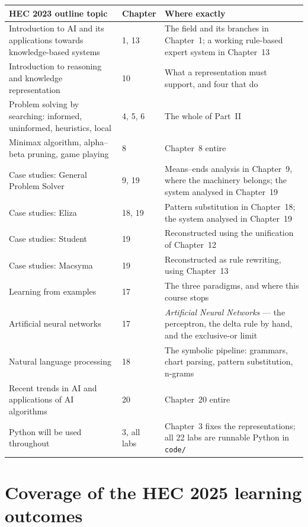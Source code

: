 \begin{longtable}{@{}L{6.4cm}L{2.0cm}L{6.6cm}@{}}
\toprule
{}
\textbf{HEC 2023 outline topic} & \textbf{Chapter} & \textbf{Where exactly} \\
\midrule
\endhead
Introduction to AI and its applications towards knowledge-based systems & 1, 13 &
The field and its branches in Chapter~1; a working rule-based expert system in
Chapter~13 \\
Introduction to reasoning and knowledge representation & 10 & What a
representation must support, and four that do \\
Problem solving by searching: informed, uninformed, heuristics, local & 4, 5, 6 &
The whole of Part~II \\
Minimax algorithm, alpha--beta pruning, game playing & 8 & Chapter~8 entire \\
Case studies: General Problem Solver & 9, 19 & Means--ends analysis in
Chapter~9, where the machinery belongs; the system analysed in Chapter~19 \\
Case studies: Eliza & 18, 19 & Pattern substitution in Chapter~18; the system
analysed in Chapter~19 \\
Case studies: Student & 19 & Reconstructed using the unification of Chapter~12 \\
Case studies: Macsyma & 19 & Reconstructed as rule rewriting, using Chapter~13 \\
Learning from examples & 17 & The three paradigms, and where this course
stops \\
Artificial neural networks & 17 & \emph{Artificial Neural Networks} --- the
perceptron, the delta rule by hand, and the exclusive-or limit \\
Natural language processing & 18 & The symbolic pipeline: grammars, chart
parsing, pattern substitution, n-grams \\
Recent trends in AI and applications of AI algorithms & 20 & Chapter~20
entire \\
Python will be used throughout & 3, all labs & Chapter~3 fixes the
representations; all 22 labs are runnable Python in \texttt{code/} \\
\bottomrule
\end{longtable}

\section*{Coverage of the HEC 2025 learning outcomes}

